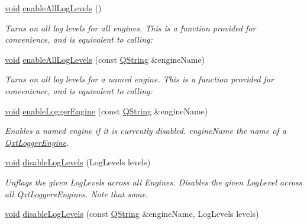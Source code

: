 \begin{DoxyCompactItemize}
\hyperlink{group___u_a_v_objects_plugin_ga444cf2ff3f0ecbe028adce838d373f5c}{void} \hyperlink{class_qxt_logger_a890a710dd1a2b429a8df158402eff800}{enable\-All\-Log\-Levels} ()
\begin{DoxyCompactList}\small\item\em Turns on all log levels for all engines. This is a function provided for convenience, and is equivalent to calling\-: \end{DoxyCompactList}\item 
\hyperlink{group___u_a_v_objects_plugin_ga444cf2ff3f0ecbe028adce838d373f5c}{void} \hyperlink{class_qxt_logger_af827eaf97ea04e41ca44796e59027354}{enable\-All\-Log\-Levels} (const \hyperlink{group___u_a_v_objects_plugin_gab9d252f49c333c94a72f97ce3105a32d}{Q\-String} \&engine\-Name)
\begin{DoxyCompactList}\small\item\em Turns on all log levels for a named engine. This is a function provided for convenience, and is equivalent to calling\-: \end{DoxyCompactList}\item 
\hyperlink{group___u_a_v_objects_plugin_ga444cf2ff3f0ecbe028adce838d373f5c}{void} \hyperlink{class_qxt_logger_a64e9e1eb9f37ec64df6f3c2421c73128}{enable\-Logger\-Engine} (const \hyperlink{group___u_a_v_objects_plugin_gab9d252f49c333c94a72f97ce3105a32d}{Q\-String} \&engine\-Name)
\begin{DoxyCompactList}\small\item\em Enables a named engine if it is currently disabled. {\itshape engine\-Name} the name of a \hyperlink{class_qxt_logger_engine}{Qxt\-Logger\-Engine}. \end{DoxyCompactList}\item 
\hyperlink{group___u_a_v_objects_plugin_ga444cf2ff3f0ecbe028adce838d373f5c}{void} \hyperlink{class_qxt_logger_a8d073c9bcec5dc538db4acbc32bd0080}{disable\-Log\-Levels} (Log\-Levels levels)
\begin{DoxyCompactList}\small\item\em Unflags the given Log\-Levels across all Engines. Disables the given Log\-Level across all Qxt\-Loggers\-Engines. Note that some. \end{DoxyCompactList}\item 
\hyperlink{group___u_a_v_objects_plugin_ga444cf2ff3f0ecbe028adce838d373f5c}{void} \hyperlink{class_qxt_logger_ae186e868646558166d9e7466d569b6ef}{disable\-Log\-Levels} (const \hyperlink{group___u_a_v_objects_plugin_gab9d252f49c333c94a72f97ce3105a32d}{Q\-String} \&engine\-Name, Log\-Levels levels)

\end{DoxyCompactItemize}

